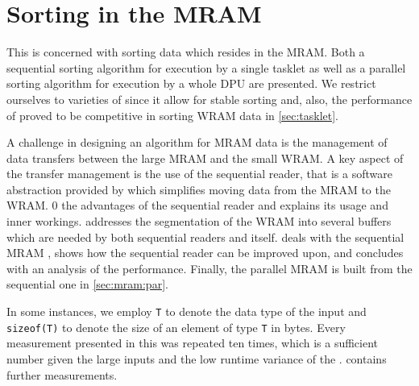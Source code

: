 \chapter[Sorting in the \texorpdfstring{\abb{MRAM}}{MRAM}]{Sorting in the \acs*{MRAM}}
\label{sec:mram}

This  is concerned with sorting data which resides in the \ac{MRAM}.
Both a sequential sorting algorithm for execution by a single tasklet as well as a parallel sorting algorithm for execution by a whole \ac{DPU} are presented.
We restrict ourselves to varieties of \MS{} since it allow for stable sorting and, also, the performance of \MS{} proved to be competitive in sorting \ac{WRAM} data in \cref{sec:tasklet}.

A challenge in designing an algorithm for \ac{MRAM} data is the management of data transfers between the large \ac{MRAM} and the small \ac{WRAM}.
A key aspect of the transfer management is the use of the sequential reader, that is a software abstraction provided by \upmem{} which simplifies moving data from the \ac{MRAM} to the \ac{WRAM}.
 0 the advantages of the sequential reader and explains its usage and inner workings.
 addresses the segmentation of the \ac{WRAM} into several buffers which are needed by both sequential readers and \MS{} itself.
 deals with the sequential \ac{MRAM} \MS{}, shows how the sequential reader can be improved upon, and concludes with an analysis of the performance.
Finally, the parallel \ac{MRAM} \MS{} is built from the sequential one in \cref{sec:mram:par}.

In some instances, we employ \lstinline|T| to denote the data type of the input and \lstinline[keywords={}]|sizeof(T)| to denote the size of an element of type \lstinline|T| in bytes.
Every measurement presented in this  was repeated ten times, which is a sufficient number given the large inputs and the low runtime variance of the \MS*{}.
 contains further measurements.








